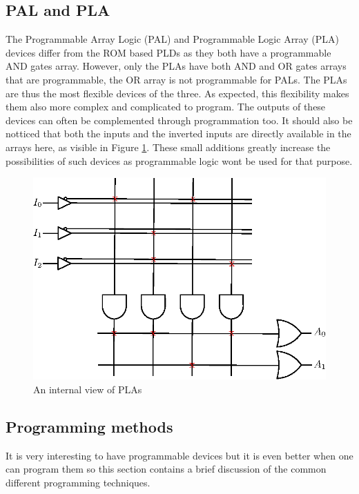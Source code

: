 \subsection{PAL and PLA}

The Programmable Array Logic (PAL) and Programmable Logic Array (PLA) devices differ from the ROM 
based PLDs as they both have a programmable AND gates array. However, only the PLAs have both AND and
OR gates arrays that are programmable, the OR array is not programmable for PALs. The PLAs are thus 
the most flexible devices of the three.
As expected, this flexibility makes them also more complex and complicated to program. The outputs
of these devices can often be complemented through programmation too. It should also be notticed
that both the inputs and the inverted inputs are directly available in the arrays here, as visible
in Figure \ref{fig:fpga/pld_pla_internal}. These small additions greatly increase the possibilities
of such devices as programmable logic wont be used for that purpose.

\begin{figure}[H]
    \centering
    \includegraphics[scale=0.8]{Chapter1-Hardware/res/pld_pla}
    \caption{An internal view of PLAs}
    \label{fig:fpga/pld_pla_internal}
\end{figure}

\subsection{Programming methods}

It is very interesting to have programmable devices but it is even better when one can program them 
so this section contains a brief discussion of the common different programming techniques.
 
